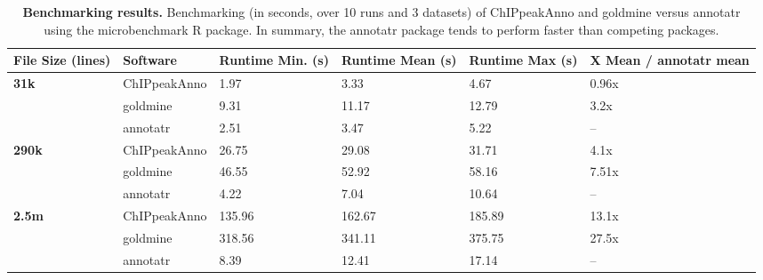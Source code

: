\begin{sidewaystable}[!ht]
\small
\centering
\begin{tabular}{ll|llll}
\textbf{File Size (lines)} & \textbf{Software} & \textbf{Runtime Min. (s)} & \textbf{Runtime Mean (s)} & \textbf{Runtime Max (s)} & \textbf{X Mean / annotatr mean} \\\hline
\textbf{31k}               & ChIPpeakAnno      & 1.97                      & 3.33                      & 4.67                     & 0.96x                           \\
\textbf{}                  & goldmine          & 9.31                      & 11.17                     & 12.79                    & 3.2x                            \\
\textbf{}                  & annotatr          & 2.51                      & 3.47                      & 5.22                     & --                              \\\hline
\textbf{290k}              & ChIPpeakAnno      & 26.75                     & 29.08                     & 31.71                    & 4.1x                            \\
\textbf{}                  & goldmine          & 46.55                     & 52.92                     & 58.16                    & 7.51x                           \\
\textbf{}                  & annotatr          & 4.22                      & 7.04                      & 10.64                    & --                              \\\hline
\textbf{2.5m}              & ChIPpeakAnno      & 135.96                    & 162.67                    & 185.89                   & 13.1x                           \\
\textbf{}                  & goldmine          & 318.56                    & 341.11                    & 375.75                   & 27.5x                           \\
\textbf{}                  & annotatr          & 8.39                      & 12.41                     & 17.14                    & --
\end{tabular}
\normalsize
\caption[Benchmarking results.]
{
\textbf{Benchmarking results.}
Benchmarking (in seconds, over 10 runs and 3 datasets) of ChIPpeakAnno and goldmine versus annotatr using the microbenchmark R package. In summary, the annotatr package tends to perform faster than competing packages.
}
\label{chap4:table:6}

\end{sidewaystable}

